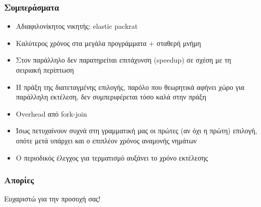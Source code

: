 \documentclass{beamer}
\begin{document}
\begin{frame}
  \frametitle{Συμπεράσματα}
  \begin{itemize}	
	\item Αδιαφιλονίκητος νικητής: elastic packrat \pause
	\item Καλύτερος χρόνος στα μεγάλα προγράμματα + σταθερή μνήμη \pause
	\item Στον παράλληλο δεν παρατηρείται επιτάχυνση (speedup) σε σχέση με τη σειριακή περίπτωση \pause
	\item H πράξη της διατεταγμένης επιλογής, παρόλο που θεωρητικά αφήνει χώρο για παράλληλη εκτέλεση, δεν συμπεριφέρεται τόσο καλά στην πράξη\pause
	\item Οverhead από fork-join\pause
	\item Ίσως πετυχαίνουν συχνά στη γραμματική μας οι πρώτες (αν όχι η πρώτη) επιλογή, οπότε μετά υπάρχει και ο επιπλέον χρόνος αναμονής νημάτων\pause
	\item Ο περιοδικός έλεγχος για τερματισμό αυξάνει το χρόνο εκτέλεσης
  \end{itemize}

\end{frame}

\begin{frame}
  \frametitle{Απορίες}
  \pause
\begin{center}
\huge Ευχαριστώ για την προσοχή σας!\footnotemark 
\end{center}
\end{frame}
\end{document}
